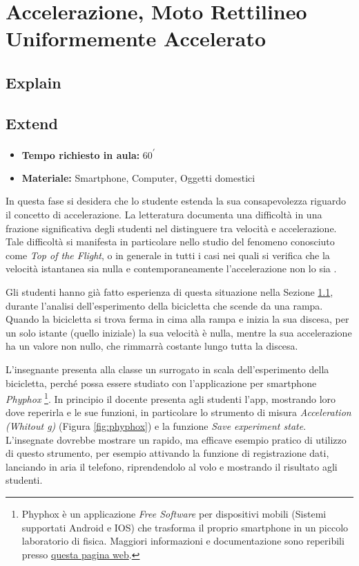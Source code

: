 \documentclass{report} \usepackage[T1]{fontenc} \usepackage[italian]{babel}
\begin{document}
\chapter{Accelerazione, Moto Rettilineo Uniformemente Accelerato}
\section{Explain}\label{a_explain}

\section{Extend}
\begin{itemize}
\item \textbf{Tempo richiesto in aula:} 60\textsuperscript{$\prime$}
\item \textbf{Materiale:} Smartphone, Computer, Oggetti domestici
\end{itemize}

In questa fase si desidera che lo studente estenda la sua consapevolezza
riguardo il concetto di accelerazione. La letteratura documenta una difficoltà
in una frazione significativa degli studenti nel distinguere tra velocità
e accelerazione. Tale difficoltà si manifesta in particolare nello studio
del fenomeno conosciuto come \emph{Top of the Flight}, o in generale
in tutti i casi nei quali si verifica che la velocità istantanea sia nulla
e contemporaneamente l'accelerazione non lo sia\cite{arons1997teaching}
\cite{trowbridge1981investigation}.

Gli studenti hanno già fatto esperienza di questa situazione nella Sezione
\ref{a_explain}, durante l'analisi dell'esperimento della bicicletta che
scende da una rampa. Quando la bicicletta si trova ferma in cima alla rampa
e inizia la sua discesa, per un solo istante (quello iniziale) la sua velocità
è nulla, mentre la sua accelerazione ha un valore non nullo, che rimmarrà costante
lungo tutta la discesa.

L'insegnante presenta alla classe un surrogato in scala dell'esperimento della
bicicletta, perché possa essere studiato con l'applicazione per smartphone
\emph{Phyphox}
\footnote{
          Phyphox è un applicazione \emph{Free Software} per dispositivi mobili
          (Sistemi supportati Android e IOS) che trasforma il proprio
          smartphone in un piccolo laboratorio di fisica. Maggiori
          informazioni e documentazione sono reperibili presso
          \href{https://phyphox.org/}{questa pagina web}.
         }.
In principio il docente presenta agli studenti l'app, mostrando loro dove
reperirla e le sue funzioni, in particolare lo strumento di misura
\emph{Acceleration (Whitout g)} (Figura \ref{fig:phyphox}) e la funzione
\emph{Save experiment state}.
L'insegnate dovrebbe mostrare un rapido, ma efficave esempio pratico
di utilizzo di questo strumento, per esempio attivando la funzione
di registrazione dati, lanciando in aria il telefono, riprendendolo
al volo e mostrando il risultato agli studenti.
\end{document}
